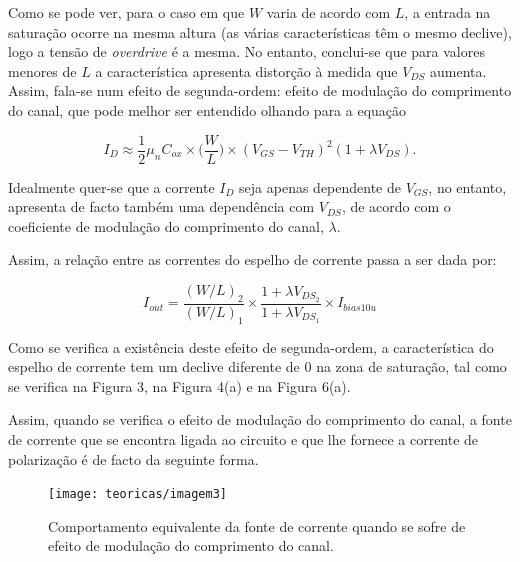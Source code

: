 \documentclass[11pt]{article}
\numberwithin{equation}{section}
\begin{document}
Como se pode ver, para o caso em que $W$ varia de acordo com $L$, a entrada na saturação ocorre na mesma altura (as várias características têm o mesmo declive), logo a tensão de \textit{overdrive} é a mesma. No entanto, conclui-se que para valores menores de $L$ a característica apresenta distorção à medida que $V_{DS}$ aumenta. Assim, fala-se num efeito de segunda-ordem: efeito de modulação do comprimento do canal, que pode melhor ser entendido olhando para a equação

\vspace{-3mm}
\begin{equation}
I_{D} \approx \frac{1}{2}\mu_{n}C_{ox}\times \Big(\frac{W}{L}\Big) \times(V_{GS}-V_{TH})^2 (1+\lambda V_{DS}).
\end{equation}

\vspace{1mm}
Idealmente quer-se que a corrente $I_{D}$ seja apenas dependente de $V_{GS}$, no entanto, apresenta de facto também uma dependência com $V_{DS}$, de acordo com o coeficiente de modulação do comprimento do canal, $\lambda$. 

Assim, a relação entre as correntes do espelho de corrente passa a ser dada por:

\vspace{-3mm}
\begin{equation}
I_{out} = \frac{({W}/{L})_{2}}{({W}/{L})_{1}} \times \frac{1+\lambda V_{DS_{2}}}{1+\lambda V_{DS_{1}}} \times I_{bias10u}
\label{eq:iout}
\end{equation}

\vspace{1mm}
Como se verifica a existência deste efeito de segunda-ordem, a característica do espelho de corrente tem um declive diferente de 0 na zona de saturação, tal como se verifica na Figura 3, na Figura 4(a) e na Figura 6(a). 

Assim, quando se verifica o efeito de modulação do comprimento do canal, a fonte de corrente que se encontra ligada ao circuito e que lhe fornece a corrente de polarização é de facto da seguinte forma.

\begin{figure}[H]
	\centering
	\texttt{[image: teoricas/imagem3]}
	\vspace{-0.5em}
	\caption{Comportamento equivalente da fonte de corrente quando se sofre de efeito de modulação do comprimento do canal.}
	\vspace{-0.8em}
\end{figure} 
\end{document}
